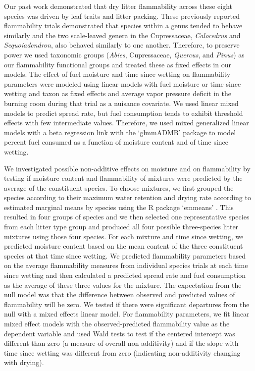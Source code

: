 \documentclass[letterpaper,12pt]{article}
\begin{document}
Our past work \citep{Magalhaes+Schwilk-2012} demonstrated that dry litter
flammability across these eight species was driven by leaf traits and litter
packing. These previously reported flammability trials demonstrated that
species within a genus tended to behave similarly and the two scale-leaved
genera in the Cupressaceae, \emph{Calocedrus} and \emph{Sequoiadendron}, also
behaved similarly to one another. Therefore, to preserve power we used taxonomic
groups (\emph{Abies}, Cupressaceae, \emph{Quercus}, and \emph{Pinus}) as our
flammability functional groups and treated these as fixed effects in our
models. The effect of fuel moisture and time since wetting on flammability
parameters were modeled using linear models with fuel moisture or time since
wetting and taxon as fixed effects and average vapor pressure deficit in the
burning room during that trial as a nuisance covariate. We used linear mixed
models to predict spread rate, but fuel consumption tends to exhibit threshold
effects with few intermediate values. Therefore, we used mixed generalized
linear models with a beta regression link with the `glmmADMB' package
\citep{Skaug_Fournier_etal-2016} to model percent fuel consumed as a function of
moisture content and of time since wetting.

We investigated possible non-additive effects on moisture and on flammability
by testing if moisture content and flammability of mixtures were predicted by
the average of the constituent species. To choose mixtures, we first grouped
the species according to their maximum water retention and drying rate
according to estimated marginal means by species using the R package `emmeans'
\citep{Lenth-2019}. This resulted in four groups of species and we then
selected one representative species from each litter type group and produced
all four possible three-species litter mixtures using those four species. For
each mixture and time since wetting, we predicted moisture content based on the
mean content of the three constituent species at that time since wetting. We
predicted flammability parameters based on the average flammability measures
from individual species trials at each time since wetting and then calculated a
predicted spread rate and fuel consumption as the average of these three values
for the mixture. The expectation from the null model was that the difference
between observed and predicted values of flammability will be zero. We tested
if there were significant departures from the null with a mixed effects linear
model. For flammability parameters, we fit linear mixed effect models with the
observed-predicted flammability value as the dependent variable and used Wald
tests to test if the centered intercept was different than zero (a measure of
overall non-additivity) and if the slope with time since wetting was different
from zero (indicating non-additivity changing with drying).
\end{document}
